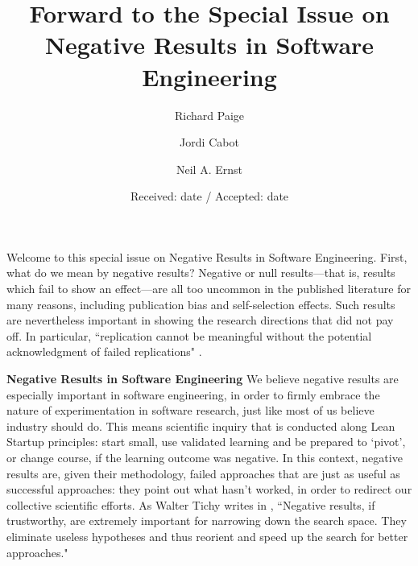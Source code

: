 \documentclass{svjour3}                     %
\begin{document}
\title{Forward to the Special Issue on Negative Results in Software Engineering}

\author{Richard Paige     \and
       Jordi Cabot \and
       Neil A. Ernst
}



\date{Received: date / Accepted: date}
\maketitle


Welcome to this special issue on Negative Results in Software Engineering. First, what do we mean by negative results? Negative or null results---that is, results which fail to show an effect---are all too uncommon in the published literature for many reasons, including publication bias and self-selection effects. Such results are nevertheless important in showing the research directions that did not pay off. In particular, ``replication cannot be meaningful without the potential acknowledgment of failed replications" \cite{FH}. %

\noindent\textbf{Negative Results in Software Engineering}
We believe negative results are especially important in software engineering, in order to firmly embrace the nature of experimentation in software research, just like most of us believe industry should do. This means scientific inquiry that is conducted along Lean Startup \cite{ries} principles: start small, use validated learning and be prepared to `pivot', or change course, if the learning outcome was negative. In this context, negative results are, given their methodology, failed approaches that are just as useful as successful approaches: they point out what hasn't worked, in order to redirect our collective scientific efforts. As Walter Tichy writes in \cite{tichy}, ``Negative results, if trustworthy, are extremely important for narrowing down the search space. They eliminate useless hypotheses and thus reorient and speed up the search for better approaches."
\end{document}
